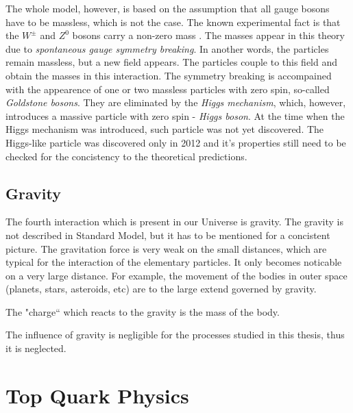 The whole model, however, is based on the assumption that all gauge bosons have to be massless, which is not the case. The known experimental fact
is that the $W^{\pm}$ and $Z^{0}$ bosons carry a non-zero mass \cite{PDG-2012}. The masses appear in this theory due to \textit{spontaneous gauge symmetry
breaking}. In another words, the particles remain massless, but a new field appears. The particles couple to this field and obtain the masses in this
interaction. The symmetry breaking is accompained with the appearence of one or two massless particles with zero spin, so-called \textit{Goldstone bosons}.
They are eliminated by the \textit{Higgs mechanism}, which, however, introduces a massive particle with zero spin - \textit{Higgs boson}. At the time when the
Higgs mechanism was introduced, such particle was not yet discovered. The Higgs-like particle was discovered only in 2012 \cite{Aad20121, Chatrchyan:2012xdj} 
and it's properties still need to be checked for the concistency to the theoretical predictions.


\subsection{Gravity}

The fourth interaction which is present in our Universe is gravity. The gravity is not described in Standard Model, but it has to be mentioned for a concistent 
picture. The gravitation force is very weak on the small distances, which are typical for the interaction of the elementary particles. It only becomes noticable
on a very large distance. For example, the movement of the bodies in outer space (planets, stars, asteroids, etc) are to the large extend governed by
gravity.

The "charge`` which reacts to the gravity is the mass of the body. 

The influence of gravity is negligible for the processes studied in this thesis, thus it is neglected.


\section{Top Quark Physics}

